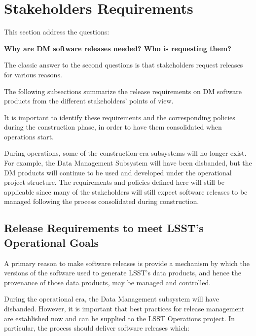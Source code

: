 \section{Stakeholders Requirements} \label{sec:reqs}

This section address the questions:

\textbf{Why are DM software releases needed? Who is requesting them?}

The classic answer to the second questions is that  stakeholders request releases for various reasons.

The following subsections summarize the release requirements on \gls{DM} software products from the different stakeholders' points of view.

It is important to identify these requirements and the corresponding policies during the construction phase, in order to have them consolidated when operations start.

During operations, some of the construction-era subsystems will no longer exist.
For example, the Data Management Subsystem will have been disbanded, but the \gls{DM} products will continue to be used and developed under the operational project structure.
The requirements and policies defined here will still be applicable since many of the stakeholders will still expect software releases to be managed following the process consolidated during construction.


\subsection{Release Requirements to meet \gls{LSST}'s Operational Goals} \label{sec:lsstreqs}

A primary reason to make software releases is provide a mechanism by which the versions of the software used to generate LSST's data products, and hence the provenance of those data products, may be managed and controlled.

During the operational era, the Data Management subsystem will have disbanded.
However, it is important that best practices for release management are established now and can be supplied to the LSST Operations project.
In particular, the process should deliver software releases which:

